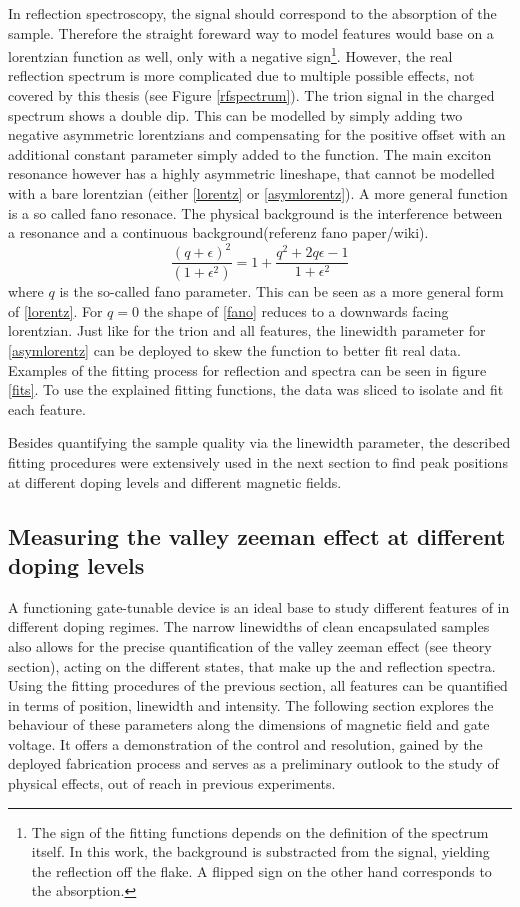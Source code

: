 In reflection spectroscopy, the signal should correspond to the absorption of the sample. Therefore the straight foreward way to model features would base on a lorentzian function as well, only with a negative sign\footnote{The sign of the fitting functions depends on the definition of the spectrum itself. In this work, the background is substracted from the signal, yielding the reflection off the flake. A flipped sign on the other hand corresponds to the absorption.}. However, the real reflection spectrum is more complicated due to multiple possible effects, not covered by this thesis (see Figure \ref{rfspectrum}). The trion signal in the charged spectrum shows a double dip. This can be modelled by simply adding two negative asymmetric lorentzians and compensating for the positive offset with an additional constant parameter simply added to the function. The main exciton resonance however has a highly asymmetric lineshape, that cannot be modelled with a bare lorentzian (either \eqref{lorentz} or \eqref{asymlorentz}). A more general function is a so called fano resonace. The physical background is the interference between a resonance and a continuous background(referenz fano paper/wiki). 
\begin{equation}
\frac{(q+\epsilon)^2}{(1+\epsilon^2)} = 1 + \frac{q^2+2q\epsilon-1}{1+\epsilon^2}\label{fano}
\end{equation}
where $q$ is the so-called fano parameter. This can be seen as a more general form of \eqref{lorentz}. For $q=0$ the shape of \eqref{fano} reduces to a downwards facing lorentzian. Just like for the trion and all \pl features, the linewidth parameter for \eqref{asymlorentz} can be deployed to skew the function to better fit real data.
Examples of the fitting process for reflection and \pl spectra can be seen in figure \ref{fits}. To use the explained fitting functions, the data was sliced to isolate and fit each feature. 

Besides quantifying the sample quality via the linewidth parameter, the described fitting procedures were extensively used in the next section to find peak positions at different doping levels and different magnetic fields.

\subsection{Measuring the valley zeeman effect at different doping levels}

A functioning gate-tunable device is an ideal base to study different features of \tmds in different doping regimes. The narrow linewidths of clean \hbng encapsulated \wse samples also allows for the precise quantification of the valley zeeman effect (see theory section), acting on the different states, that make up the \pl and reflection spectra. Using the fitting procedures of the previous section, all features can be quantified in terms of position, linewidth and intensity. The following section explores the behaviour of these parameters along the dimensions of magnetic field and gate voltage. It offers a demonstration of the control and resolution, gained by the deployed fabrication process and serves as a preliminary outlook to the study of physical effects, out of reach in previous experiments. 

